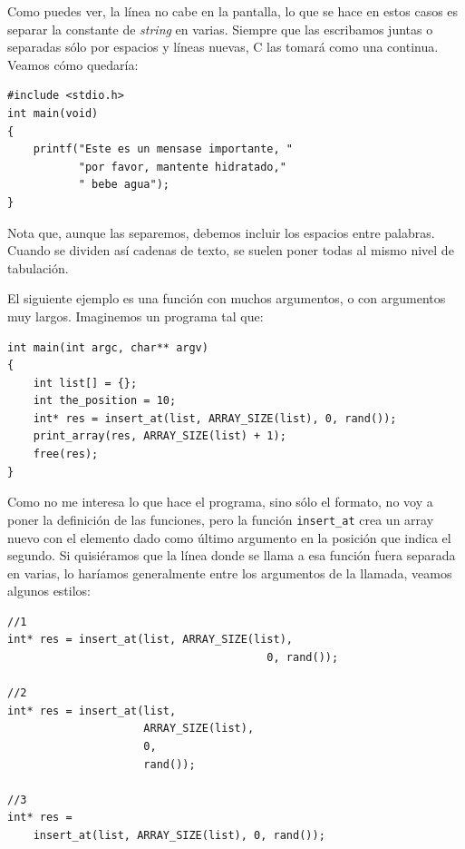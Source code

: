 \documentclass[a4paper]{article}
\begin{document}
Como puedes ver, la línea no cabe en la pantalla, lo que se hace en estos
casos es separar la constante de \textit{string} en varias. Siempre que las
escribamos juntas o separadas sólo por espacios y líneas nuevas, C las tomará
como una continua. Veamos cómo quedaría:

\noindent
\begin{minipage}[H]{\linewidth}
\mbox{}
\begin{lstlisting}[style=C,
caption={Impresión larga},
label={lst:longprint}]
#include <stdio.h>
int main(void)
{
    printf("Este es un mensase importante, "
           "por favor, mantente hidratado,"
           " bebe agua");
}
\end{lstlisting}
\end{minipage}

Nota que, aunque las separemos, debemos incluir los espacios entre palabras.
Cuando se dividen así cadenas de texto, se suelen poner todas al mismo nivel
de tabulación.

El siguiente ejemplo es una función con muchos argumentos, o con argumentos
muy largos. Imaginemos un programa tal que:

\noindent
\begin{minipage}[H]{\linewidth}
\mbox{}
\begin{lstlisting}[style=C,
caption={Muchos argumentos},
label={lst:manyArgs}]
int main(int argc, char** argv)
{
    int list[] = {};
    int the_position = 10;
    int* res = insert_at(list, ARRAY_SIZE(list), 0, rand());
    print_array(res, ARRAY_SIZE(list) + 1);
    free(res);
}
\end{lstlisting}
\end{minipage}

Como no me interesa lo que hace el programa, sino sólo el formato, no voy a
poner la definición de las funciones, pero la función \verb!insert_at! crea
un array nuevo con el elemento dado como último argumento en la posición que
indica el segundo. Si quisiéramos que la línea donde se llama a esa función
fuera separada en varias, lo haríamos generalmente entre los argumentos de la
llamada, veamos algunos estilos:

\noindent
\begin{minipage}[H]{\linewidth}
\mbox{}
\begin{lstlisting}[style=C,
caption={Cómo acortar líneas con muchos argumentos},
label={lst:manyArgsShorting}]
//1
int* res = insert_at(list, ARRAY_SIZE(list),
                                        0, rand());

//2
int* res = insert_at(list,
                     ARRAY_SIZE(list),
                     0,
                     rand());

//3
int* res =
    insert_at(list, ARRAY_SIZE(list), 0, rand());
\end{lstlisting}
\end{minipage}
\end{document}
